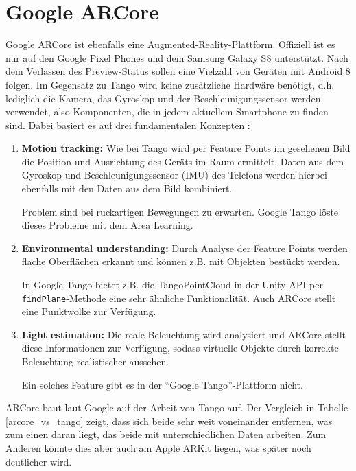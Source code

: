 
\section{Google ARCore}
Google ARCore ist ebenfalls eine Augmented-Reality-Plattform. Offiziell ist es nur auf den Google Pixel Phones und dem Samsung Galaxy S8 unterstützt. Nach dem Verlassen des Preview-Status sollen eine Vielzahl von Geräten mit Android 8 folgen. Im Gegensatz zu Tango wird keine zusätzliche Hardwäre benötigt, d.h. lediglich die Kamera, das Gyroskop und der Beschleunigungssensor werden verwendet, also Komponenten, die in jedem aktuellem Smartphone zu finden sind. Dabei basiert es auf drei fundamentalen Konzepten \cite{arcore_overview}:
\begin{enumerate}
	\item \textbf{Motion tracking:} Wie bei Tango wird per Feature Points im gesehenen Bild die Position und Ausrichtung des Geräts im Raum ermittelt. Daten aus dem Gyroskop und Beschleunigungssensor (IMU) des Telefons werden hierbei ebenfalls mit den Daten aus dem Bild kombiniert. \cite{arcore_fundamentals}
	
	Problem sind bei ruckartigen Bewegungen zu erwarten. Google Tango löste dieses Probleme mit dem Area Learning.
	
	\item \textbf{Environmental understanding:}  Durch Analyse der Feature Points werden flache Oberflächen erkannt und können z.B. mit Objekten bestückt werden. \cite{arcore_fundamentals}
	
	In Google Tango bietet z.B. die TangoPointCloud in der Unity-API per \texttt{findPlane}-Methode eine sehr ähnliche Funktionalität. Auch ARCore stellt eine Punktwolke zur Verfügung.
	
	\item \textbf{Light estimation:} Die reale Beleuchtung wird analysiert und ARCore stellt diese Informationen zur Verfügung, sodass virtuelle Objekte durch korrekte Beleuchtung realistischer aussehen. \cite{arcore_fundamentals}
	
	Ein solches Feature gibt es in der "`Google Tango"'-Plattform nicht.
\end{enumerate}

ARCore baut laut Google auf der Arbeit von Tango auf. Der Vergleich in Tabelle \ref{arcore_vs_tango} zeigt, dass sich beide sehr weit voneinander entfernen, was zum einen daran liegt, das beide mit unterschiedlichen Daten arbeiten. Zum Anderen könnte dies aber auch am Apple ARKit liegen, was später noch deutlicher wird.

